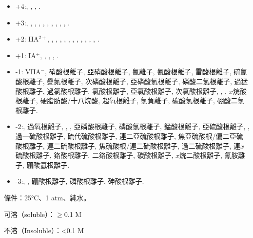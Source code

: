 \documentclass[a4paper,12pt]{report}
\begin{document}
\begin{itemize}
\item +4:, , , .
\item +3:, , , , , , , , , , .
\item +2: IIA$^{2+}$, , , , , , , , , , , , .
\item +1: IA$^+$, , , , .
\item -1: VIIA$^-$, 硝酸根離子, 亞硝酸根離子, 氰離子, 氰酸根離子, 雷酸根離子, 硫氰酸根離子, 疊氮根離子, 次磷酸根離子, 亞磷酸氫根離子, 磷酸二氫根離子, 過猛酸根離子, 過氯酸根離子, 氯酸根離子, 亞氯酸根離子, 次氯酸根離子, , , $x$烷酸根離子, 硬脂肪酸/十八烷酸, 超氧根離子, 氫負離子, 碳酸氫根離子, 硼酸二氫根離子.
\item -2:, 過氧根離子, , , 亞磷酸根離子, 磷酸氫根離子, 錳酸根離子, 亞硫酸根離子, , 過一硫酸根離子, 硫代硫酸根離子, 連二亞硫酸根離子, 焦亞硫酸根/偏二亞硫酸根離子, 連二硫酸根離子, 焦硫酸根/連二硫酸根離子, 過二硫酸根離子, 連$x$硫酸根離子, 鉻酸根離子, 二鉻酸根離子, 碳酸根離子, $x$烷二酸根離子, 氰胺離子, 硼酸氫根離子.
\item -3:, , 硼酸根離子, 磷酸根離子, 砷酸根離子.
\end{itemize}
條件：25°C、1 atm、純水。

\bit
\item 可溶（soluble）：$\geq$0.1 M
\item 不溶（Insoluble）：<0.1 M
\eit
\end{document}
